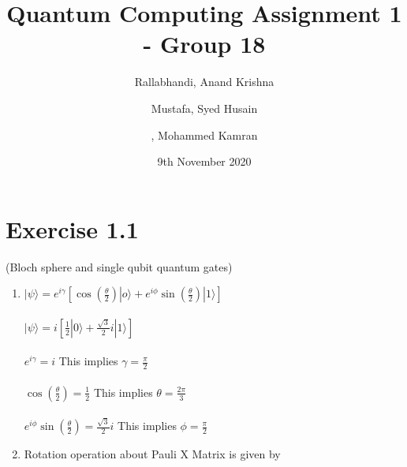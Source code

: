 \documentclass[a4paper,12pt]{article}
\title{Quantum Computing Assignment 1 - Group 18}
\author{
    Rallabhandi, Anand Krishna 
    \and
    Mustafa, Syed Husain
    \and
     , Mohammed Kamran 
}
\date{9th November 2020}
\begin{document}
\maketitle

\section*{Exercise 1.1}

 (Bloch sphere and single qubit quantum gates)

\begin{enumerate}[label=(\alph*)]
    \item $|\psi\rangle = e^{i\gamma}[ \cos(\frac{\theta}{2})|o\rangle +       e^{i\phi}\sin(\frac{\theta}{2})|1\rangle ] $
          \\~\\
          $|\psi\rangle =i[\frac{1}{2}|0\rangle + \frac{\sqrt{3}}{2}i|1\rangle ]$
          \\~\\
          $e^{i\gamma} = i$ This implies $\gamma = \frac{\pi}{2}$
          \\~\\
          $\cos(\frac{\theta}{2}) = \frac{1}{2}$ This implies $\theta = \frac{2\pi}{3}$
          \\~\\
          $e^{i\phi}\sin(\frac{\theta}{2}) = \frac{\sqrt{3}}{2}i$ This implies $\phi = \frac{\pi}{2}$

    \item \vspace{5mm}
          \begin{flushleft}
              Rotation operation about Pauli X Matrix is given by
          \end{flushleft}


\end{enumerate}
\end{document}

